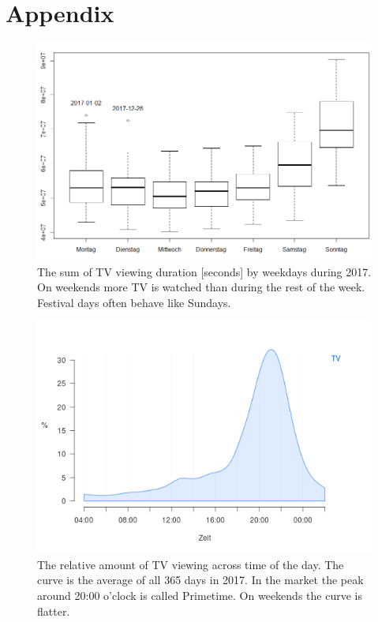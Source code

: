 \documentclass[]{article}
\begin{document}
\hypertarget{appendix}{%
\section{Appendix}\label{appendix}}

\begin{figure}[H]

{\centering \includegraphics[width=0.75\linewidth]{../data/tv-week} 

}

\caption{\label{fig:fig1}The sum of TV viewing duration [seconds] by weekdays during 2017. On weekends more TV is watched than during the rest of the week. Festival days often behave like Sundays.}\label{fig:fig1}
\end{figure}

\begin{figure}[H]

{\centering \includegraphics[width=0.75\linewidth]{../data/tv-day} 

}

\caption{\label{fig:fig2} The relative amount of TV viewing across time of the day. The curve is the average of all 365 days in 2017. In the market the peak around 20:00 o'clock is called Primetime. On weekends the curve is flatter.}\label{fig:fig2}
\end{figure}
\end{document}
